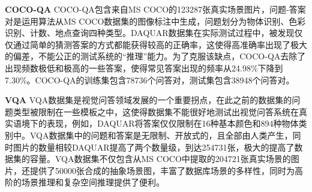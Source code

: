 
\textbf{COCO-QA}\qquad
COCO-QA包含来自MS COCO的123287张真实场景图片，问题-答案对是运用算法从MS COCO数据集的图像标注中生成，问题划分为物体识别、色彩识别、计数、地点查询四种类型。DAQUAR数据集在实际测试过程中，被发现仅仅通过简单的猜测答案的方式都能获得较高的正确率，这使得高准确率出现了极大的偏差，不能公正的测试系统的“推理”能力。为了克服该缺点，COCO-QA去除了出现频数极低和极高的一些答案，使得常见答案出现的频率从24.98\%下降到7.30\%。COCO-QA的训练集包含78736个问答对，测试集包含38948个问答对。

\textbf{VQA}\qquad
VQA数据集是视觉问答领域发展的一个重要拐点，在此之前的数据集的问题类型被限制在一些模板之中，这使得数据集不能很好地测试出视觉问答系统在真实语境下的表现，例如，DAQUAR将答案仅仅限制在16种基本颜色和894种物体类别中。VQA数据集中的问题和答案是无限制、开放式的，且全部由人类产生，同时图片的数量相较DAQUAR提高了两个数量级，到达254731张，极大的提高了数据集的容量。VQA数据集不仅包含从MS COCO中提取的204721张真实场景的图片，还提供了50000张合成的抽象场景图，丰富了数据库场景的多样性，同时为高阶的场景推理和复杂空间推理提供了便利。

